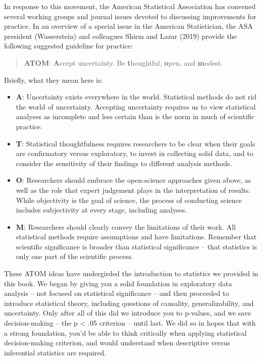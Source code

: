 \documentclass[
  letterpaper,
  DIV=11,
  numbers=noendperiod]{scrreprt}
\providecommand{\tightlist}{%
  \setlength{\itemsep}{0pt}\setlength{\parskip}{0pt}}\usepackage{longtable,booktabs,array}
\theoremstyle{definition}
\theoremstyle{remark}
\begin{document}
In response to this movement, the American Statistical Association has
convened several working groups and journal issues devoted to discussing
improvements for practice. In an overview of a special issue in the
American Statistician, the ASA president (Wasserstein) and colleagues
Shirm and Lazar (2019) provide the following suggested guideline for
practice:

\begin{quote}
\textbf{ATOM}: \textbf{A}ccept uncertainty. Be \textbf{t}houghtful,
\textbf{o}pen, and \textbf{m}odest.
\end{quote}

Briefly, what they mean here is:

\begin{itemize}
\tightlist
\item
  \textbf{A}: Uncertainty exists everywhere in the world. Statistical
  methods do not rid the world of uncertainty. Accepting uncertainty
  requires us to view statistical analyses as incomplete and less
  certain than is the norm in much of scientific practice.
\item
  \textbf{T}: Statistical thoughtfulness requires researchers to be
  clear when their goals are confirmatory versus exploratory, to invest
  in collecting solid data, and to consider the sensitivity of their
  findings to different analysis methods.
\item
  \textbf{O}: Researchers should embrace the open-science approaches
  given above, as well as the role that expert judgement plays in the
  interpretation of results. While objectivity is the goal of science,
  the process of conducting science includes subjectivity at every
  stage, including analyses.
\item
  \textbf{M}: Researchers should clearly convey the limitations of their
  work. All statistical methods require assumptions and have
  limitations. Remember that scientific significance is broader than
  statistical significance -- that statistics is only one part of the
  scientific process.
\end{itemize}

These ATOM ideas have undergirded the introduction to statistics we
provided in this book. We began by giving you a solid foundation in
exploratory data analysis -- not focused on statistical significance --
and then proceeded to introduce statistical theory, including questions
of causality, generalizability, and uncertainty. Only after all of this
did we introduce you to p-values, and we save decision-making -- the p
\textless{} .05 criterion -- until last. We did so in hopes that with a
strong foundation, you'd be able to think critically when applying
statistical decision-making criterion, and would understand when
descriptive versus inferential statistics are required.
\end{document}
